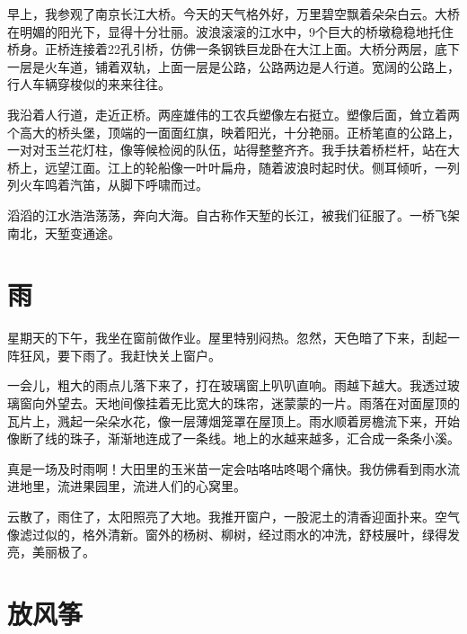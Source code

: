 \documentclass[12pt,UTF-8,openany]{ctexbook}
\begin{document}
\begin{large}
    
    早上，我参观了南京长江大桥。今天的天气格外好，万里碧空飘着朵朵白云。大桥在明媚的阳光下，显得十分壮丽。波浪滚滚的江水中，9个巨大的桥墩稳稳地托住桥身。正桥连接着22孔引桥，仿佛一条钢铁巨龙卧在大江上面。大桥分两层，底下一层是火车道，铺着双轨，上面一层是公路，公路两边是人行道。宽阔的公路上，行人车辆穿梭似的来来往往。
    
    我沿着人行道，走近正桥。两座雄伟的工农兵塑像左右挺立。塑像后面，耸立着两个高大的桥头堡，顶端的一面面红旗，映着阳光，十分艳丽。正桥笔直的公路上，一对对玉兰花灯柱，像等候检阅的队伍，站得整整齐齐。我手扶着桥栏杆，站在大桥上，远望江面。江上的轮船像一叶叶扁舟，随着波浪时起时伏。侧耳倾听，一列列火车鸣着汽笛，从脚下呼啸而过。
    
    滔滔的江水浩浩荡荡，奔向大海。自古称作天堑的长江，被我们征服了。一桥飞架南北，天堑变通途。
    
\end{large}



\chapter{雨}

\begin{large}
    
    星期天的下午，我坐在窗前做作业。屋里特别闷热。忽然，天色暗了下来，刮起一阵狂风，要下雨了。我赶快关上窗户。
    
    一会儿，粗大的雨点儿落下来了，打在玻璃窗上叭叭直响。雨越下越大。我透过玻璃窗向外望去。天地间像挂着无比宽大的珠帘，迷蒙蒙的一片。雨落在对面屋顶的瓦片上，溅起一朵朵水花，像一层薄烟笼罩在屋顶上。雨水顺着房檐流下来，开始像断了线的珠子，渐渐地连成了一条线。地上的水越来越多，汇合成一条条小溪。
    
    真是一场及时雨啊！大田里的玉米苗一定会咕咯咕咚喝个痛快。我仿佛看到雨水流进地里，流进果园里，流进人们的心窝里。
    
    云散了，雨住了，太阳照亮了大地。我推开窗户，一股泥土的清香迎面扑来。空气像滤过似的，格外清新。窗外的杨树、柳树，经过雨水的冲洗，舒枝展叶，绿得发亮，美丽极了。
    
\end{large}



\chapter{放风筝}
\end{document}

